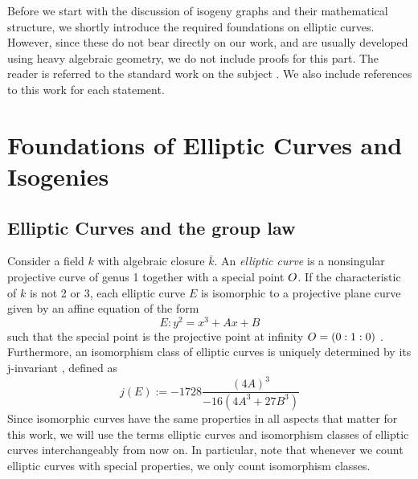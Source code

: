 
Before we start with the discussion of isogeny graphs and their mathematical structure, we shortly introduce the required foundations on elliptic curves.
However, since these do not bear directly on our work, and are usually developed using heavy algebraic geometry, we do not include proofs for this part.
The reader is referred to the standard work on the subject \cite{arithmetic_elliptic_curves}.
We also include references to this work for each statement.

\section{Foundations of Elliptic Curves and Isogenies}

\subsection{Elliptic Curves and the group law}
Consider a field $k$ with algebraic closure $\bar{k}$.
An \emph{elliptic curve} is a nonsingular projective curve of genus 1 together with a special point $O$.
If the characteristic of $k$ is not 2 or 3, each elliptic curve $E$ is isomorphic to a projective plane curve given by an affine equation of the form
\begin{equation*}
    E: y^2 = x^3 + Ax + B
\end{equation*}
such that the special point is the projective point at infinity $O = (0 : 1 : 0)$ \cite[Prop.~III.3.1]{arithmetic_elliptic_curves}.
Furthermore, an isomorphism class of elliptic curves is uniquely determined by its j-invariant \cite[Prop.~III.1.4]{arithmetic_elliptic_curves}, defined as
\begin{equation*}
    j(E) := -1728 \frac {(4A)^3} {-16(4A^3 + 27B^3)}
\end{equation*}
Since isomorphic curves have the same properties in all aspects that matter for this work, we will use the terms elliptic curves and isomorphism classes of elliptic curves interchangeably from now on.
In particular, note that whenever we count elliptic curves with special properties, we only count isomorphism classes. 

